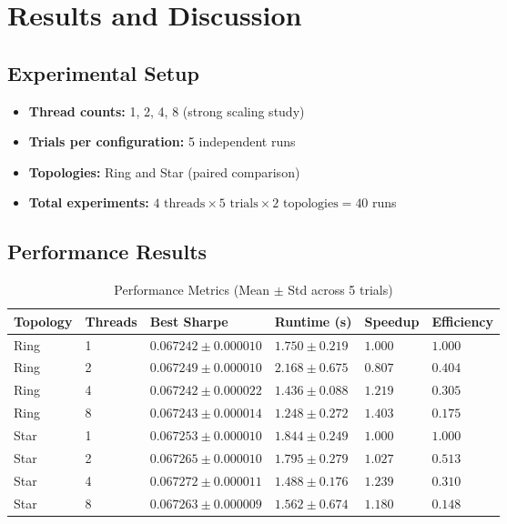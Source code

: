 \documentclass[12pt,a4paper]{article}
\begin{document}
\newpage
\section{Results and Discussion}

\subsection{Experimental Setup}

\begin{itemize}
	\item \textbf{Thread counts:} 1, 2, 4, 8 (strong scaling study)
	\item \textbf{Trials per configuration:} 5 independent runs
	\item \textbf{Topologies:} Ring and Star (paired comparison)
	\item \textbf{Total experiments:} $4 \text{ threads} \times 5 \text{ trials} \times 2 \text{ topologies} = 40$ runs
\end{itemize}

\subsection{Performance Results}

\begin{longtable}[htp]{|p{1.2cm}|p{1.2cm}|p{1.8cm}|p{1.8cm}|p{1.5cm}|p{1.5cm}|}
\caption{Performance Metrics (Mean $\pm$ Std across 5 trials)}
\label{Table:Performance}
\hline
\textbf{Topology} & \textbf{Threads} & \textbf{Best Sharpe} & \textbf{Runtime (s)} & \textbf{Speedup} & \textbf{Efficiency} \\
\hline
Ring & 1 & $0.067242 \pm 0.000010$ & $1.750 \pm 0.219$ & $1.000$ & $1.000$ \\
\hline
Ring & 2 & $0.067249 \pm 0.000010$ & $2.168 \pm 0.675$ & $0.807$ & $0.404$ \\
\hline
Ring & 4 & $0.067242 \pm 0.000022$ & $1.436 \pm 0.088$ & $1.219$ & $0.305$ \\
\hline
Ring & 8 & $0.067243 \pm 0.000014$ & $1.248 \pm 0.272$ & $1.403$ & $0.175$ \\
\hline
Star & 1 & $0.067253 \pm 0.000010$ & $1.844 \pm 0.249$ & $1.000$ & $1.000$ \\
\hline
Star & 2 & $0.067265 \pm 0.000010$ & $1.795 \pm 0.279$ & $1.027$ & $0.513$ \\
\hline
Star & 4 & $0.067272 \pm 0.000011$ & $1.488 \pm 0.176$ & $1.239$ & $0.310$ \\
\hline
Star & 8 & $0.067263 \pm 0.000009$ & $1.562 \pm 0.674$ & $1.180$ & $0.148$ \\
\hline
\end{longtable}
\end{document}
